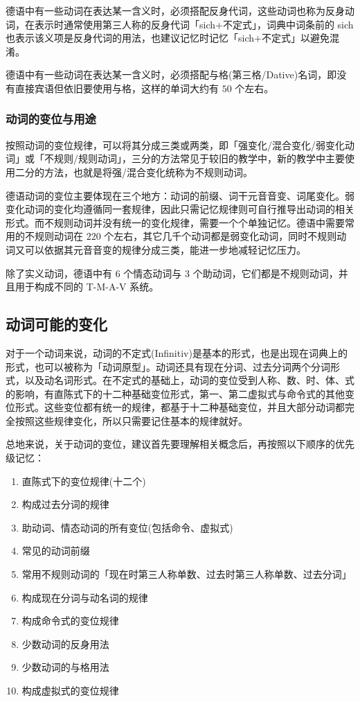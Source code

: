 德语中有一些动词在表达某一含义时，必须搭配反身代词，这些动词也称为反身动词，在表示时通常使用第三人称的反身代词「sich+不定式」，词典中词条前的 sich 也表示该义项是反身代词的用法，也建议记忆时记忆「sich+不定式」以避免混淆。

德语中有一些动词在表达某一含义时，必须搭配与格(第三格/Dative)名词，即没有直接宾语但依旧要使用与格，这样的单词大约有 $50$ 个左右。


\subsubsection{动词的变位与用途}

按照动词的变位规律，可以将其分成三类或两类，即「强变化/混合变化/弱变化动词」或「不规则/规则动词」，三分的方法常见于较旧的教学中，新的教学中主要使用二分的方法，也就是将强/混合变化统称为不规则动词。

德语动词的变位主要体现在三个地方：动词的前缀、词干元音音变、词尾变化。弱变化动词的变化均遵循同一套规律，因此只需记忆规律则可自行推导出动词的相关形式。而不规则动词并没有统一的变化规律，需要一个个单独记忆。德语中需要常用的不规则动词在 $220$ 个左右，其它几千个动词都是弱变化动词，同时不规则动词又可以依据其元音音变的规律分成三类，能进一步地减轻记忆压力。


除了实义动词，德语中有 $6$ 个情态动词与 $3$ 个助动词，它们都是不规则动词，并且用于构成不同的 T-M-A-V 系统。


\subsection{动词可能的变化}

对于一个动词来说，动词的不定式(Infinitiv)是基本的形式，也是出现在词典上的形式，也可以被称为「动词原型」。动词还具有现在分词、过去分词两个分词形式，以及动名词形式。在不定式的基础上，动词的变位受到人称、数、时、体、式的影响，有直陈式下的十二种基础变位形式，第一、第二虚拟式与命令式的其他变位形式。这些变位都有统一的规律，都基于十二种基础变位，并且大部分动词都完全按照这些规律变化，所以只需要记住基本的规律就好。

总地来说，关于动词的变位，建议首先要理解相关概念后，再按照以下顺序的优先级记忆：

\begin{enumerate}[leftmargin=3.5em, topsep=0pt, itemsep=0pt, parsep=0pt]
    \item 直陈式下的变位规律(十二个)
    \item 构成过去分词的规律
    \item 助动词、情态动词的所有变位(包括命令、虚拟式)
    \item 常见的动词前缀
    \item 常用不规则动词的「现在时第三人称单数、过去时第三人称单数、过去分词」
    \item 构成现在分词与动名词的规律
    \item 构成命令式的变位规律
    \item 少数动词的反身用法
    \item 少数动词的与格用法
    \item 构成虚拟式的变位规律
\end{enumerate}

